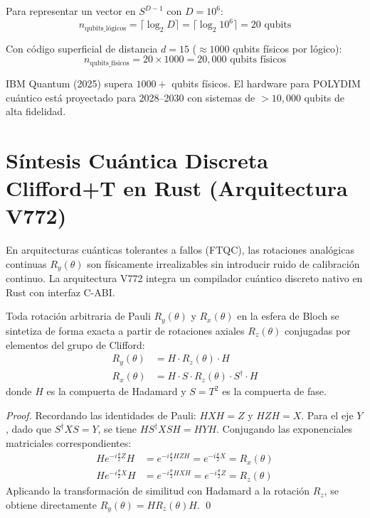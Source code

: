 Para representar un vector en $S^{D-1}$ con $D = 10^6$:
\begin{equation}
n_{\text{qubits\_lógicos}} = \lceil \log_2 D \rceil = \lceil \log_2 10^6 \rceil = 20 \text{ qubits}
\end{equation}

Con código superficial de distancia $d = 15$ ($\approx 1000$ qubits físicos por lógico):
\begin{equation}
n_{\text{qubits\_físicos}} = 20 \times 1000 = 20{,}000 \text{ qubits físicos}
\end{equation}

IBM Quantum (2025) supera $1000+$ qubits físicos. El hardware para POLYDIM cuántico
está proyectado para 2028--2030 con sistemas de $>10{,}000$ qubits de alta fidelidad.

\section{Síntesis Cuántica Discreta Clifford+T en Rust (Arquitectura V772)}


En arquitecturas cuánticas tolerantes a fallos (FTQC), las rotaciones analógicas continuas $R_y(\theta)$ son físicamente irrealizables sin introducir ruido de calibración continuo. La arquitectura V772 integra un compilador cuántico discreto nativo en Rust con interfaz C-ABI.

\begin{theorem}

Toda rotación arbitraria de Pauli $R_y(\theta)$ y $R_x(\theta)$ en la esfera de Bloch se sintetiza de forma exacta a partir de rotaciones axiales $R_z(\theta)$ conjugadas por elementos del grupo de Clifford:
\begin{align}
R_y(\theta) &= H \cdot R_z(\theta) \cdot H \\
R_x(\theta) &= H \cdot S \cdot R_z(\theta) \cdot S^\dagger \cdot H
\end{align}
donde $H$ es la compuerta de Hadamard y $S = T^2$ es la compuerta de fase.
\end{theorem}

\begin{proof}
Recordando las identidades de Pauli: $H X H = Z$ y $H Z H = X$. Para el eje $Y$, dado que $S^\dagger X S = Y$, se tiene $H S^\dagger X S H = H Y H$. Conjugando las exponenciales matriciales correspondientes:
\begin{align}
H e^{-i \frac{\theta}{2} Z} H &= e^{-i \frac{\theta}{2} H Z H} = e^{-i \frac{\theta}{2} X} = R_x(\theta) \\
H e^{-i \frac{\theta}{2} X} H &= e^{-i \frac{\theta}{2} H X H} = e^{-i \frac{\theta}{2} Z} = R_z(\theta)
\end{align}
Aplicando la transformación de similitud con Hadamard a la rotación $R_z$, se obtiene directamente $R_y(\theta) = H R_z(\theta) H$. \qed
\end{proof}

